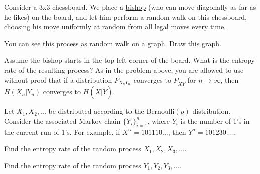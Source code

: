 \documentclass[a4paper,10pt,landscape,twocolumn]{scrartcl}
\begin{document}



\begin{exercise}
Consider a 3x3 chessboard. We place a \href{https://en.wikipedia.org/wiki/Bishop_(chess)}{bishop} (who can move diagonally as far as he likes) on the board, and let him perform a random walk on this chessboard, choosing his move uniformly at random from all legal moves every time. 

\begin{subex}
You can see this process as random walk on a graph. Draw this graph.
\end{subex}

\begin{subex}
Assume the bishop starts in the top left corner of the board. What is the entropy rate of the resulting process? As in the problem above, you are allowed to use without proof that if a distribution $P_{X_n Y_n}$ converges to $P_{\tilde{X} \tilde{Y}}$ for $n \to \infty$, then $H(X_n|Y_n)$ converges to $H(\tilde{X}|\tilde{Y})$.
\end{subex}

\end{exercise}


\begin{exercise}
Let $X_1, X_2, ...$ be distributed according to the Bernoulli$(p)$ distribution. Consider the associated Markov chain $\{Y_i\}_{i=1}^n$, where $Y_i$ is the number of 1's in the current run of 1's. For example, if $X^n = 101110...$, then $Y^n = 101230....$.
\begin{subex}
Find the entropy rate of the random process $X_1, X_2, X_3, \ldots$.
\end{subex}
\begin{subex}
Find the entropy rate of the random process $Y_1, Y_2, Y_3, \ldots$.
\end{subex}
\end{exercise}
\end{document}
